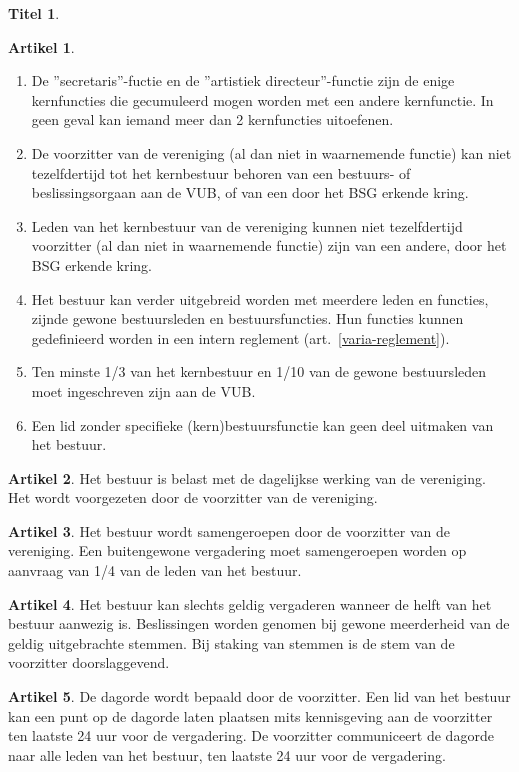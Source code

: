 \documentclass[a4paper,10pt]{article}
\theoremstyle{definition}
\newtheorem{titel}{\newline\Large Titel}
\newtheorem{artikelbase}{\large Artikel}
\newenvironment{artikel}
  {\begin{artikelbase}}
  {\smallskip
   \end{artikelbase}}
\newcommand{\ttextcr}{\hfill\newline}
\begin{document}
\begin{titel}
\begin{artikel}
\begin{enumerate}
      \item
        De ''secretaris''-fuctie en de ''artistiek directeur''-functie zijn de enige kernfuncties die gecumuleerd mogen worden met een andere kernfunctie.
        In geen geval kan iemand meer dan 2 kernfuncties uitoefenen.
      \item De voorzitter van de vereniging (al dan niet in waarnemende functie) kan niet tezelfdertijd tot het kernbestuur behoren van een bestuurs- of beslissingsorgaan aan de VUB, of van een door het BSG erkende kring.
      \item Leden van het kernbestuur van de vereniging kunnen niet tezelfdertijd voorzitter (al dan niet in waarnemende functie) zijn van een andere, door het BSG erkende kring. %
      \item Het bestuur kan verder uitgebreid worden met meerdere leden en functies, zijnde gewone bestuursleden en bestuursfuncties.
        Hun functies kunnen gedefinieerd worden in een intern reglement (art.~\ref{varia-reglement}).
      \item Ten minste 1/3 van het kernbestuur en 1/10 van de gewone bestuursleden moet ingeschreven zijn aan de VUB.
      \item Een lid zonder specifieke (kern)bestuursfunctie kan geen deel uitmaken van het bestuur.
    \end{enumerate}
  \end{artikel}

  \begin{artikel}\ttextcr
    Het bestuur is belast met de dagelijkse werking van de vereniging.
    Het wordt voorgezeten door de voorzitter van de vereniging.
  \end{artikel}

  \begin{artikel}\ttextcr
    Het bestuur wordt samengeroepen door de voorzitter van de vereniging.
    Een buitengewone vergadering moet samengeroepen worden op aanvraag van 1/4 van de leden van het bestuur.
  \end{artikel}

  \begin{artikel}\ttextcr
    Het bestuur kan slechts geldig vergaderen wanneer de helft van het bestuur aanwezig is.
    Beslissingen worden genomen bij gewone meerderheid van de geldig uitgebrachte stemmen.
    Bij staking van stemmen is de stem van de voorzitter doorslaggevend.
  \end{artikel}

  \begin{artikel}\ttextcr
    De dagorde wordt bepaald door de voorzitter.
    Een lid van het bestuur kan een punt op de dagorde laten plaatsen mits kennisgeving aan de voorzitter ten laatste 24 uur voor de vergadering.
    De voorzitter communiceert de dagorde naar alle leden van het bestuur, ten laatste 24 uur voor de vergadering.
  \end{artikel}

\end{titel}
\end{document}
